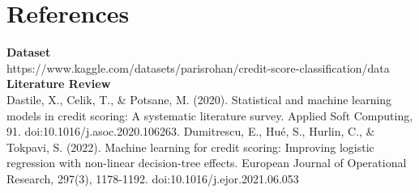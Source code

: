 \documentclass[11pt, twocolumn]{article}
\begin{document}
\section*{References}
\textbf{Dataset}\\
https://www.kaggle.com/datasets/parisrohan/credit-score-classification/data
\vspace{5mm}\newline
\textbf{Literature Review}\\
Dastile, X., Celik, T., \& Potsane, M. (2020).
Statistical and machine learning models in credit scoring: A systematic literature survey.
Applied Soft Computing, 91. doi:10.1016/j.asoc.2020.106263.
\vspace{5mm}\newline
Dumitrescu, E., Hué, S., Hurlin, C., \& Tokpavi, S. (2022). 
Machine learning for credit scoring: Improving logistic regression 
with non-linear decision-tree effects. European Journal of Operational 
Research, 297(3), 1178-1192. doi:10.1016/j.ejor.2021.06.053
\end{document}
